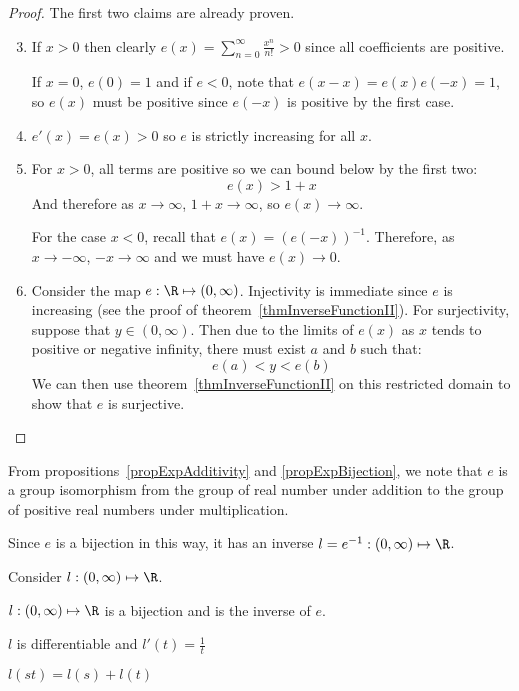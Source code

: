 \documentclass[../Main.tex]{subfiles}
\begin{document}
\begin{proof}
    The first two claims are already proven.
    \begin{enumerate}
        \setcounter{enumi}{2} %
        \item If $x > 0$ then clearly $e(x) = \sum_{n = 0}^\infty \frac{x^n}{n!} > 0$ since all coefficients are positive.
        
            If $x = 0$, $e(0) = 1$ and if $e < 0$, note that $e(x - x) = e(x) e(-x) = 1$, so $e(x)$ must be positive since $e(-x)$ is positive by the first case.
        \item $e'(x) = e(x) > 0$ so $e$ is strictly increasing for all $x$.
        \item For $x > 0$, all terms are positive so we can bound below by the first two:
            \begin{equation*}
                e(x) > 1 + x 
            \end{equation*}
            And therefore as $x \to \infty$, $1 + x \to \infty$, so $e(x) \to \infty$.

            For the case $x < 0$, recall that $e(x) = (e(-x))^{-1}$. Therefore, as $x \to -\infty$, $-x \to \infty$ and we must have $e(x) \to 0$.
        \item Consider the map $e : \R \mapsto (0, \infty)$.
            Injectivity is immediate since $e$ is increasing (see the proof of theorem~\ref{thmInverseFunctionII}). For surjectivity, suppose that $y \in (0, \infty)$. Then due to the limits of $e(x)$ as $x$ tends to positive or negative infinity, there must exist $a$ and $b$ such that:
            \begin{equation*}
                e(a) < y < e(b)
            \end{equation*}
            We can then use theorem~\ref{thmInverseFunctionII} on this restricted domain to show that $e$ is surjective.
    \end{enumerate}
\end{proof}
From propositions~\ref{propExpAdditivity} and \ref{propExpBijection}, we note that $e$ is a group isomorphism from the group of real number under addition to the group of positive real numbers under multiplication.\par
Since $e$ is a bijection in this way, it has an inverse $l = e^{-1} : (0, \infty) \mapsto \R$.
\begin{propositions}{
        Consider $l : (0, \infty) \mapsto \R$.
        \label{propsLogRealProps}
    }
    \item $l : (0, \infty) \mapsto \R$ is a bijection and is the inverse of $e$. \label{propLogInverseOfExp}
    \item $l$ is differentiable and $l'(t) = \frac{1}{t}$ \label{propLogDerivative}
    \item $l(st) = l(s) + l(t)$ \label{propLogMultity}
\end{propositions}
\end{document}
